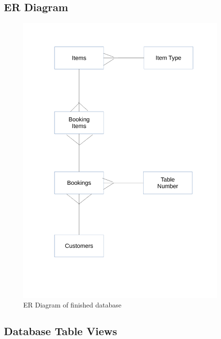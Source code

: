 \subsection{ER Diagram}
\begin{figure}[H]
    \includegraphics[height = 15cm]{./Maintenance/images/erDiagram}
    \caption{ER Diagram of finished database} \label{fig:erDiagram}
\end{figure}

\subsection{Database Table Views}

